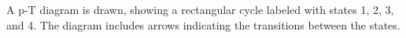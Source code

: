 A p-T diagram is drawn, showing a rectangular cycle labeled with states 1, 2, 3, and 4. The diagram includes arrows indicating the transitions between the states.